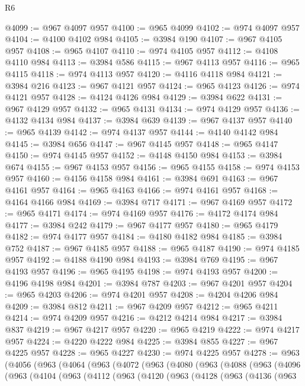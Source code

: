 \begin{lexlean}{R6}
\begin{coremodule}
@4099 := @967 @4097 @957
@4100 := @965 @4099
@4102 := @974 @4097 @957
@4104 := @4100 @4102 @984
@4105 := @3984 @190
@4107 := @967 @4105 @957
@4108 := @965 @4107
@4110 := @974 @4105 @957
@4112 := @4108 @4110 @984
@4113 := @3984 @586
@4115 := @967 @4113 @957
@4116 := @965 @4115
@4118 := @974 @4113 @957
@4120 := @4116 @4118 @984
@4121 := @3984 @216
@4123 := @967 @4121 @957
@4124 := @965 @4123
@4126 := @974 @4121 @957
@4128 := @4124 @4126 @984
@4129 := @3984 @622
@4131 := @967 @4129 @957
@4132 := @965 @4131
@4134 := @974 @4129 @957
@4136 := @4132 @4134 @984
@4137 := @3984 @639
@4139 := @967 @4137 @957
@4140 := @965 @4139
@4142 := @974 @4137 @957
@4144 := @4140 @4142 @984
@4145 := @3984 @656
@4147 := @967 @4145 @957
@4148 := @965 @4147
@4150 := @974 @4145 @957
@4152 := @4148 @4150 @984
@4153 := @3984 @674
@4155 := @967 @4153 @957
@4156 := @965 @4155
@4158 := @974 @4153 @957
@4160 := @4156 @4158 @984
@4161 := @3984 @691
@4163 := @967 @4161 @957
@4164 := @965 @4163
@4166 := @974 @4161 @957
@4168 := @4164 @4166 @984
@4169 := @3984 @717
@4171 := @967 @4169 @957
@4172 := @965 @4171
@4174 := @974 @4169 @957
@4176 := @4172 @4174 @984
@4177 := @3984 @242
@4179 := @967 @4177 @957
@4180 := @965 @4179
@4182 := @974 @4177 @957
@4184 := @4180 @4182 @984
@4185 := @3984 @752
@4187 := @967 @4185 @957
@4188 := @965 @4187
@4190 := @974 @4185 @957
@4192 := @4188 @4190 @984
@4193 := @3984 @769
@4195 := @967 @4193 @957
@4196 := @965 @4195
@4198 := @974 @4193 @957
@4200 := @4196 @4198 @984
@4201 := @3984 @787
@4203 := @967 @4201 @957
@4204 := @965 @4203
@4206 := @974 @4201 @957
@4208 := @4204 @4206 @984
@4209 := @3984 @812
@4211 := @967 @4209 @957
@4212 := @965 @4211
@4214 := @974 @4209 @957
@4216 := @4212 @4214 @984
@4217 := @3984 @837
@4219 := @967 @4217 @957
@4220 := @965 @4219
@4222 := @974 @4217 @957
@4224 := @4220 @4222 @984
@4225 := @3984 @855
@4227 := @967 @4225 @957
@4228 := @965 @4227
@4230 := @974 @4225 @957
@4278 := @963
    (@4056
      (@963
        (@4064
          (@963
            (@4072
              (@963
                (@4080
                  (@963
                    (@4088
                      (@963
                        (@4096
                          (@963
                            (@4104
                              (@963
                                (@4112
                                  (@963
                                    (@4120
                                      (@963
                                        (@4128
                                          (@963
                                            (@4136
                                              (@963

\end{coremodule}
\end{lexlean}
